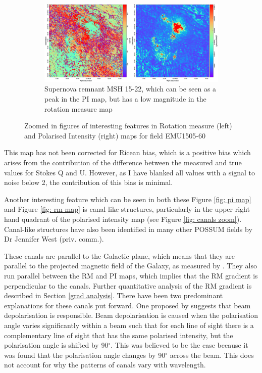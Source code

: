 \begin{figure}
      \begin{subfigure}[b]{\textwidth}
        \includegraphics[width=\linewidth]{Thesis_Template/Figures/RM_PI_MSH 15-22.png}
        \caption{Supernova remnant MSH 15-22, which can be seen as a peak in the PI map, but has a low magnitude in the rotation measure map}
        \label{fig: sn zoom}
    \end{subfigure}
    

   
    
    \caption{Zoomed in figures of interesting features in Rotation measure (left) and Polarised Intensity (right) maps for field EMU1505-60}
    \label{fig:pi and rm zooms}
\end{figure}



This map has not been corrected for Ricean bias, which is a positive bias which arises from the contribution of the difference between the measured and true values for Stokes Q and U. However, as I have blanked all values with a signal to noise below 2, the contribution of this bias is minimal.

Another interesting feature which can be seen in both these Figure \ref{fig: pi map} and Figure \ref{fig: rm map} is canal like structures, particularly in the upper right hand quadrant of the polarised intensity map (see Figure \ref{fig: canals zoom}). Canal-like structures have also been identified in many other POSSUM fields by Dr Jennifer West (priv. comm.).

These canals are parallel to the Galactic plane, which means that they are parallel to the projected magnetic field of the Galaxy, as measured by \cite{Planck_XXV}. They also run parallel between the RM and PI maps, which implies that the RM gradient is perpendicular to the canals. Further quantitative analysis of the RM gradient is described in Section \ref{grad analysis}. There have been two predominant explanations for these canals put forward. One proposed by \cite{Haverkornetal_2000} suggests that beam depolarisation is responsible. Beam depolarisation is caused when the polarisation angle varies significantly within a beam such that for each line of sight there is a complementary line of sight that has the same polarised intensity, but the polarisation angle is shifted by 90$^\circ$. This was believed to be the case because it was found that the polarisation angle changes by 90$^\circ$ across the beam. This does not account for why the patterns of canals vary with wavelength.

